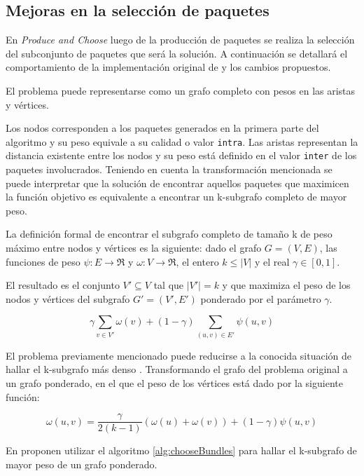 \subsection{Mejoras en la selección de paquetes}
En \emph{Produce and Choose} luego de la producción de paquetes se realiza la selección del subconjunto de paquetes que será la solución. A continuación se detallará el comportamiento de la implementación original de \cite{journals/tkde/Amer-YahiaBCFMZ14} y los cambios propuestos.

El problema puede representarse como un grafo completo con pesos en las aristas y vértices. 

Los nodos corresponden a los paquetes generados en la primera parte del algoritmo y su peso equivale a su calidad o valor \texttt{intra}. Las aristas representan la distancia existente entre los nodos y su peso está definido en el valor \texttt{inter} de los paquetes involucrados. Teniendo en cuenta la transformación mencionada se puede interpretar que la solución de encontrar aquellos paquetes que maximicen la función objetivo es equivalente a encontrar un k-subgrafo completo de mayor peso.

La definición formal de encontrar el subgrafo completo de tamaño k de peso máximo entre nodos y vértices es la siguiente: dado el grafo $ G = (V,E) $, las funciones de peso $\psi : E \rightarrow \Re$ y $\omega : V \rightarrow \Re$, el entero $ k \leq |V| $ y el real $\gamma \in [0,1]$. 

El resultado es el conjunto $V' \subseteq V$ tal que $|V'| = k$ y que maximiza el peso de los nodos y vértices del subgrafo $G' = (V', E')$ ponderado por el parámetro $\gamma$.

\begin{equation}
\gamma \sum_{v \in V'}{\omega(v)} + (1 - \gamma) \sum_{(u,v) \in E'}{\psi(u,v)}
\end{equation}

El problema previamente mencionado puede reducirse a la conocida situación de hallar el k-subgrafo más denso \cite{DBLP:journals/algorithmica/FeigePK01}. Transformando el grafo del problema original a un grafo ponderado, en el que el peso de los vértices está dado por la siguiente función:
 
\begin{equation}
\omega(u,v) = \dfrac{\gamma}{2( k - 1)} (\omega(u) + \omega(v)) + (1 - \gamma)\psi(u,v) 
\end{equation}

En \cite{journals/tkde/Amer-YahiaBCFMZ14} proponen utilizar el algoritmo \ref{alg:chooseBundles} para hallar el k-subgrafo de mayor peso de un grafo ponderado. 

